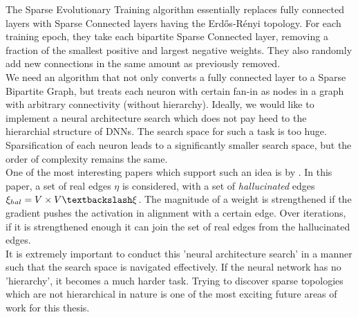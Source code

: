 The Sparse Evolutionary Training algorithm essentially replaces fully connected layers with Sparse Connected layers having the {Erd\H{o}s-R\'{e}nyi} topology. For each training epoch, they take each bipartite Sparse Connected layer, removing a fraction of the smallest positive and largest negative weights. They also randomly add new connections in the same amount as previously removed. \\
We need an algorithm that not only converts a fully connected layer to a Sparse Bipartite Graph, but treats each neuron with certain fan-in as nodes in a graph with arbitrary connectivity (without hierarchy). Ideally, we would like to implement a neural architecture search which does not pay heed to the hierarchial structure of DNNs. The search space for such a task is too huge. Sparsification of each neuron leads to a significantly smaller search space, but the order of complexity remains the same. \\
One of the most interesting papers which support such an idea is by \cite{Wortsman2019DiscoveringNW}. In this paper, a set of real edges $\eta$ is considered, with a set of \textit{hallucinated} edges $\xi_{hal} = V\times V \textbackslash \xi$. The magnitude of a weight is strengthened if the gradient pushes the activation in alignment with a certain edge. Over iterations, if it is strengthened enough it can join the set of real edges from the hallucinated edges. \\
It is extremely important to conduct this 'neural architecture search' in a manner such that the search space is navigated effectively. If the neural network has no 'hierarchy', it becomes a much harder task. Trying to discover sparse topologies which are not hierarchical in nature is one of the most exciting future areas of work for this thesis. 

